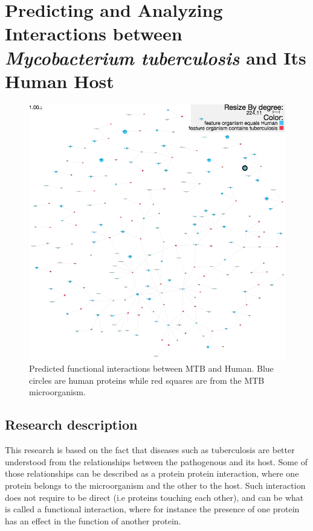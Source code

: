\section{Predicting and Analyzing Interactions between \emph{Mycobacterium tuberculosis} and Its Human Host} \label{sec:mb_human}
\begin{figure}
\centering
\includegraphics[width=5in]{figures/pinv_human_mtb.png}
\caption[Predicted functional interactions between MTB and Human]{Predicted functional interactions between MTB and Human. Blue circles are human proteins while red squares are from the MTB microorganism.
\label{fig:pinv_human_mtb}}
\end{figure}

\subsection{Research description}
This research is based on the fact that diseases such as tuberculosis are better understood from the relationships between the pathogenous and its host. Some of those relationships can be described as a protein protein interaction, where one protein belongs to the microorganism and the other to the host. Such interaction does not require to be direct (i.e proteins touching each other), and can be what is called a functional interaction, where for instance  the presence of one protein has an effect in the function of another protein. 

